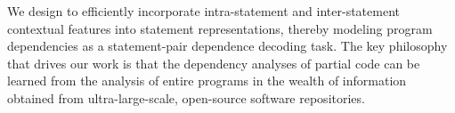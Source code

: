 We design {\tool} to efficiently incorporate intra-statement and
inter-statement contextual features into statement representations,
thereby modeling program dependencies as a statement-pair dependence
decoding task. The key philosophy that drives our work is that the
dependency analyses of partial code can be learned from the analysis
of entire programs in the wealth of information obtained from
ultra-large-scale, open-source software repositories.
